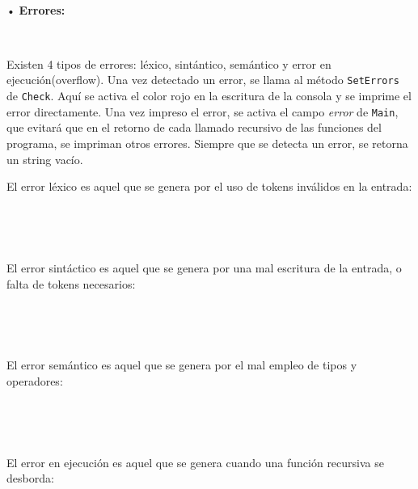 \documentclass{article}
\begin{document}
\


• \textbf{Errores:}


\


Existen 4 tipos de errores: léxico, sintántico, semántico y error en ejecución(overflow). Una vez detectado un error, se llama al 
método {\texttt{SetErrors}} de {\texttt{Check}}. Aquí se activa el color rojo en la escritura de la consola y se imprime el error
directamente. Una vez impreso el error, se activa el campo {\textit{error}} de {\texttt{Main}}, que evitará que en el retorno de cada
llamado recursivo de las funciones del programa, se impriman otros errores. Siempre que se detecta un error, se retorna un string
vacío.


El error léxico es aquel que se genera por el uso de tokens inválidos en la entrada: 


\ 



\ 


El error sintáctico es aquel que se genera por una mal escritura de la entrada, o falta de tokens necesarios:


\ 





\ 


El error semántico es aquel que se genera por el mal empleo de tipos y operadores:


\ 





\ 


El error en ejecución es aquel que se genera cuando una función recursiva se desborda:


\ 
\end{document}
